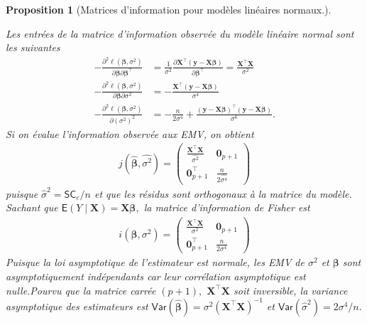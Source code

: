 \documentclass[
  11pt,
  letterpaper,
]{scrbook}
\theoremstyle{plain}
\newtheorem{proposition}{Proposition}[chapter]
\theoremstyle{plain}
\theoremstyle{definition}
\theoremstyle{definition}
\theoremstyle{remark}
\begin{document}
\begin{proposition}[Matrices d'information pour modèles linéaires
normaux.]\protect\hypertarget{prp-info-normal}{}\label{prp-info-normal}

Les entrées de la matrice d'information observée du modèle linéaire
normal sont les suivantes \begin{align*}
-\frac{\partial^2 \ell(\boldsymbol{\beta}, \sigma^2)}{\partial \boldsymbol{\beta}\partial \boldsymbol{\beta}^\top} &= \frac{1}{\sigma^2} \frac{\partial \mathbf{X}^\top(\boldsymbol{y}-\mathbf{X}\boldsymbol{\beta})}{\partial \boldsymbol{\beta}^\top} =  \frac{\mathbf{X}^\top\mathbf{X}}{\sigma^2}\\
-\frac{\partial^2 \ell(\boldsymbol{\beta}, \sigma^2)}{\partial \boldsymbol{\beta}\partial \sigma^2} &=- \frac{\mathbf{X}^\top(\boldsymbol{y}-\mathbf{X}\boldsymbol{\beta})}{\sigma^4}\\
-\frac{\partial^2 \ell(\boldsymbol{\beta}, \sigma^2)}{\partial (\sigma^2)^2} &= -\frac{n}{2\sigma^4} + \frac{(\boldsymbol{y}-\mathbf{X}\boldsymbol{\beta})^\top(\boldsymbol{y}-\mathbf{X}\boldsymbol{\beta})}{\sigma^6}.
\end{align*} Si on évalue l'information observée aux EMV, on obtient
\begin{align*}
j(\widehat{\boldsymbol{\beta}}, \widehat{\sigma^2}) = 
\begin{pmatrix}
\frac{\mathbf{X}^\top\mathbf{X}}{\widehat{\sigma^2}} & \boldsymbol{0}_{p+1} \\  \boldsymbol{0}_{p+1}^\top & \frac{n}{2\widehat{\sigma^4}}
\end{pmatrix}
\end{align*} puisque \(\widehat{\sigma}^2=\mathsf{SC}_e/n\) et que les
résidus sont orthogonaux à la matrice du modèle. Sachant que
\(\mathsf{E}(Y \mid \mathbf{X})=\mathbf{X}\boldsymbol{\beta},\) la
matrice d'information de Fisher est \begin{align*}
i(\boldsymbol{\beta}, \sigma^2) = 
\begin{pmatrix}
\frac{\mathbf{X}^\top\mathbf{X}}{\sigma^2} & \boldsymbol{0}_{p+1} \\  \boldsymbol{0}_{p+1}^\top & \frac{n}{2\sigma^4}
\end{pmatrix}
\end{align*} Puisque la loi asymptotique de l'estimateur est normale,
les EMV de \(\sigma^2\) et \(\boldsymbol{\beta}\) sont asymptotiquement
indépendants car leur corrélation asymptotique est nulle.Pourvu que la
matrice carrée \((p+1),\) \(\mathbf{X}^\top\mathbf{X}\) soit inversible,
la variance asymptotique des estimateurs est
\(\mathsf{Var}(\widehat{\boldsymbol{\beta}})=\sigma^2(\mathbf{X}^\top\mathbf{X})^{-1}\)
et \(\mathsf{Var}(\widehat{\sigma}^2) = 2\sigma^4/n.\)

\end{proposition}
\end{document}
